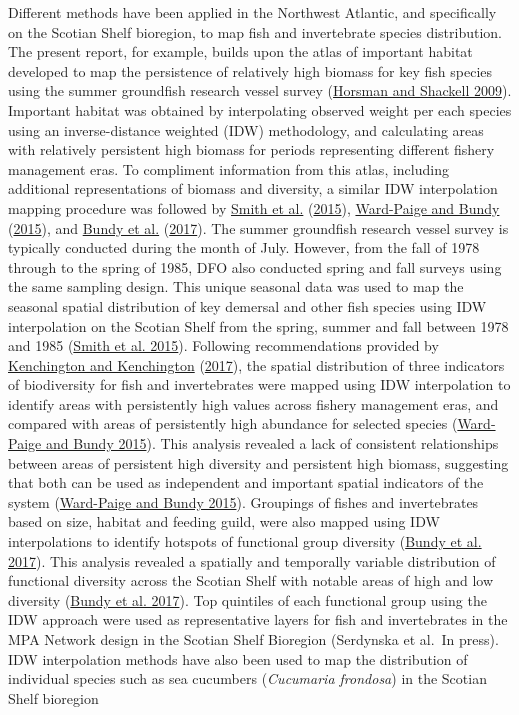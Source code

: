 \documentclass[12pt]{article}\usepackage[]{graphicx}\usepackage[]{color}
\begin{document}
Different methods have been applied in the Northwest Atlantic, and specifically on the Scotian Shelf bioregion, to map fish and invertebrate species distribution. The present report, for example, builds upon the atlas of important habitat developed to map the persistence of relatively high biomass for key fish species using the summer groundfish research vessel survey (\protect\hyperlink{ref-Horsman:atlas:2009}{Horsman and Shackell 2009}). Important habitat was obtained by interpolating observed weight per each species using an inverse-distance weighted (IDW) methodology, and calculating areas with relatively persistent high biomass for periods representing different fishery management eras. To compliment information from this atlas, including additional representations of biomass and diversity, a similar IDW interpolation mapping procedure was followed by \protect\hyperlink{ref-Smith2015}{Smith et al.} (\protect\hyperlink{ref-Smith2015}{2015}), \protect\hyperlink{ref-WardPaige2016}{Ward-Paige and Bundy} (\protect\hyperlink{ref-WardPaige2016}{2015}), and \protect\hyperlink{ref-Bundyetal2017}{Bundy et al.} (\protect\hyperlink{ref-Bundyetal2017}{2017}). The summer groundfish research vessel survey is typically conducted during the month of July. However, from the fall of 1978 through to the spring of 1985, DFO also conducted spring and fall surveys using the same sampling design. This unique seasonal data was used to map the seasonal spatial distribution of key demersal and other fish species using IDW interpolation on the Scotian Shelf from the spring, summer and fall between 1978 and 1985 (\protect\hyperlink{ref-Smith2015}{Smith et al. 2015}). Following recommendations provided by \protect\hyperlink{ref-Kenchingtons2013}{Kenchington and Kenchington} (\protect\hyperlink{ref-Kenchingtons2013}{2017}), the spatial distribution of three indicators of biodiversity for fish and invertebrates were mapped using IDW interpolation to identify areas with persistently high values across fishery management eras, and compared with areas of persistently high abundance for selected species (\protect\hyperlink{ref-WardPaige2016}{Ward-Paige and Bundy 2015}). This analysis revealed a lack of consistent relationships between areas of persistent high diversity and persistent high biomass, suggesting that both can be used as independent and important spatial indicators of the system (\protect\hyperlink{ref-WardPaige2016}{Ward-Paige and Bundy 2015}). Groupings of fishes and invertebrates based on size, habitat and feeding guild, were also mapped using IDW interpolations to identify hotspots of functional group diversity (\protect\hyperlink{ref-Bundyetal2017}{Bundy et al. 2017}). This analysis revealed a spatially and temporally variable distribution of functional diversity across the Scotian Shelf with notable areas of high and low diversity (\protect\hyperlink{ref-Bundyetal2017}{Bundy et al. 2017}). Top quintiles of each functional group using the IDW approach were used as representative layers for fish and invertebrates in the MPA Network design in the Scotian Shelf Bioregion (Serdynska et al.~In press). IDW interpolation methods have also been used to map the distribution of individual species such as sea cucumbers (\emph{Cucumaria frondosa}) in the Scotian Shelf bioregion 
\end{document}
